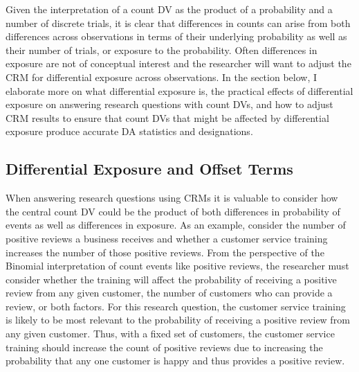 \documentclass[ShortAfour,times,sageapa]{sagej}
\begin{document}
	Given the interpretation of a count DV as the product of a probability and a number of discrete trials, it is clear that differences in counts can arise from both differences across observations in terms of their underlying probability as well as their number of trials, or exposure to the probability.
	Often differences in exposure are not of conceptual interest and the researcher will want to adjust the CRM for differential exposure across observations.
	In the section below, I elaborate more on what differential exposure is, the practical effects of differential exposure on answering research questions with count DVs, and how to adjust CRM results to ensure that count DVs that might be affected by differential exposure produce accurate DA statistics and designations.

	\subsection{Differential Exposure and Offset Terms}
	
	When answering research questions using CRMs it is valuable to consider how the central count DV could be the product of both differences in probability of events as well as differences in exposure. 
	As an example, consider the number of positive reviews a business receives and whether a customer service training increases the number of those positive reviews.
	From the perspective of the Binomial interpretation of count events like positive reviews, the researcher must consider whether the training will affect the probability of receiving a positive review from any given customer, the number of customers who can provide a review, or both factors.
	For this research question, the customer service training is likely to be most relevant to the probability of receiving a positive review from any given customer.
	Thus, with a fixed set of customers, the customer service training should increase the count of positive reviews due to increasing the probability that any one customer is happy and thus provides a positive review.
	
\end{document}
